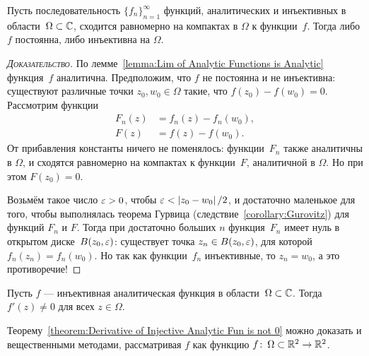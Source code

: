 \documentclass[../complex-analysis.tex]{subfiles}
\begin{document}
\begin{thm}
 \label{theorem:analytic_injective}
Пусть последовательность $ \{f_{n}\}_{n=1}^{\infty}  $ функций, аналитических и инъективных в области~$ \Omega \subset \mathbb{C} $, сходится равномерно на компактах в $ \Omega $ к функции~$ f $. Тогда либо $ f $ постоянна, либо инъективна на $ \Omega $.
\end{thm}
\begin{proof}[\normalfont\textsc{Доказательство}]
 По лемме~\ref{lemma:Lim of Analytic Functions is Analytic} функция~$ f $ аналитична. Предположим, что $ f $ не постоянна и не инъективна: существуют различные точки $ z_0,w_0 \in \Omega $ такие, что $ f(z_0) - f(w_0) = 0 $. Рассмотрим функции
 \begin{align*}
  F_n(z) &= f_n(z) - f_n(w_0),\\
  F(z) &= f(z) - f(w_0).
 \end{align*} От прибавления константы ничего не поменялось: функции~$ F_n $ также аналитичны в $ \Omega $, и сходятся равномерно на компактах к функции~$ F $, аналитичной в $ \Omega $. Но при этом $ F(z_0) = 0 $.

 Возьмём такое число $ \varepsilon > 0 $, чтобы $ \varepsilon < \left| z_0 - w_0 \right| / 2 $, и достаточно маленькое для того, чтобы выполнялась теорема Гурвица (следствие~\ref{corollary:Gurovitz}) для функций $ F_n $ и $ F $. Тогда при достаточно больших $ n $ функция~$ F_n $ имеет нуль в открытом диске~$ B(z_0,\varepsilon) $: существует точка $ z_n \in B(z_0,\varepsilon) $, для которой $ f_n(z_n) = f_n(w_0) $. Но так как функции~$ f_n $ инъективные, то $z_n = w_0$, а это противоречие!
\end{proof}

\begin{thm}
 \label{theorem:Derivative of Injective Analytic Fun is not 0}
 Пусть $ f $ --- инъективная аналитическая функция в области~$ \Omega \subset \mathbb{C} $. Тогда $ f'(z) \neq 0 $ для всех $ z \in \Omega $.
\end{thm}

Теорему~\ref{theorem:Derivative of Injective Analytic Fun is not 0} можно доказать и вещественными методами, рассматривая $ f $ как функцию $ f\colon\,\Omega \subset \mathbb{R}^{2} \to \mathbb{R}^{2} $.
\end{document}
